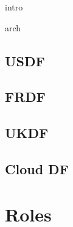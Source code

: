  {intro}

 {arch}






\subsection{USDF}
\subsection{FRDF}
\subsection{UKDF}
\subsection{Cloud DF}


\section{Roles}
